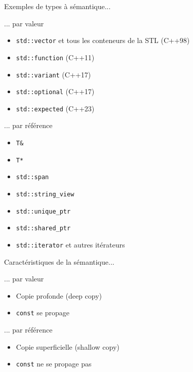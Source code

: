 \documentclass[french]{beamer}
\begin{document}
\begin{frame}[fragile]{Exemples de types à sémantique...}
    \begin{minipage}{0.45\linewidth}
        ... par valeur
        \begin{itemize}
            \item \lstinline{std::vector} et tous les conteneurs de la STL (C++98)
            \item \lstinline{std::function} (C++11)
            \item \lstinline{std::variant} (C++17)
            \item \lstinline{std::optional} (C++17)
            \item \lstinline{std::expected} (C++23)
        \end{itemize}
    \end{minipage}
    \begin{minipage}{0.45\linewidth}
        ... par référence
        \begin{itemize}
            \item \lstinline{T&}
            \item \lstinline{T*}
            \item \lstinline{std::span}
            \item \lstinline{std::string_view}
            \item \lstinline{std::unique_ptr}
            \item \lstinline{std::shared_ptr}
            \item \lstinline{std::iterator} et autres itérateurs
        \end{itemize}
    \end{minipage}
\end{frame}

\begin{frame}[fragile]{Caractéristiques de la sémantique...}
    \begin{minipage}{0.45\linewidth}
        ... par valeur
        \begin{itemize}
            \item Copie profonde (deep copy)
            \item \lstinline{const} se propage
        \end{itemize}
    \end{minipage}
    \begin{minipage}{0.45\linewidth}
        ... par référence
        \begin{itemize}
            \item Copie superficielle (shallow copy)
            \item \lstinline{const} ne se propage pas
        \end{itemize}
    \end{minipage}
\end{frame}
\end{document}
